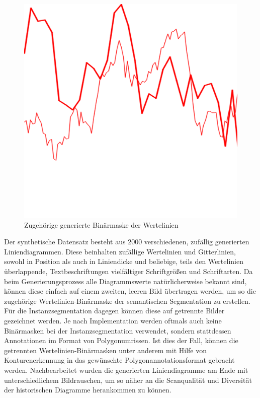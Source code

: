 \begin{figure}[h!]
\begin{minipage}{0.475\textwidth}
        \includegraphics[width=\linewidth]{Methodik/img/lines_synthetic_mask.png}
        \caption{ Zugehörige generierte Binärmaske der Wertelinien}
        \label{fig:lines_synthetic_mask}
    \end{minipage}
\end{figure}

Der synthetische Datensatz besteht aus 2000 verschiedenen, zufällig generierten Liniendiagrammen. Diese beinhalten zufällige Wertelinien und Gitterlinien, sowohl in Position als auch in Liniendicke und beliebige, teils den Wertelinien überlappende, Textbeschriftungen vielfältiger Schriftgrößen und Schriftarten. Da beim Generierungsprozess alle Diagrammswerte natürlicherweise bekannt sind, können diese einfach auf einem zweiten, leeren Bild übertragen werden, um so die zugehörige Wertelinien-Binärmaske der semantischen Segmentation zu erstellen. Für die Instanzsegmentation dagegen können diese auf getrennte Bilder gezeichnet werden. Je nach Implementation werden oftmals auch keine Binärmasken bei der Instanzsegmentation verwendet, sondern stattdessen Annotationen im Format von Polygonumrissen. Ist dies der Fall, können die getrennten Wertelinien-Binärmasken unter anderem mit Hilfe von Konturenerkennung in das gewünschte Polygonannotationsformat gebracht werden. Nachbearbeitet wurden die generierten Liniendiagramme am Ende mit unterschiedlichem Bildrauschen, um so näher an die Scanqualität und Diversität der historischen Diagramme herankommen zu können.

